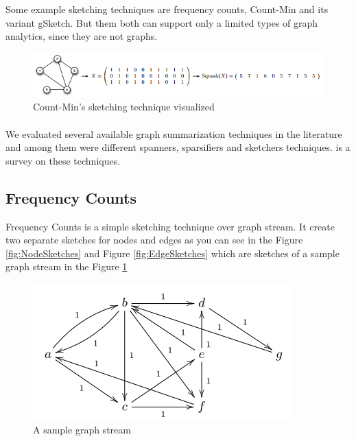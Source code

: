 \documentclass[12pt]{report}
\numberwithin{figure}{section}
\numberwithin{table}{section}
\begin{document}
Some example sketching techniques are frequency counts\cite{frequency counts}, Count-Min\cite{CountMin} and its variant gSketch\cite{gSketch}. But them both can support only a limited types of graph analytics, since they are not graphs.

\begin{figure}[H]
\centering
\includegraphics[scale=0.6]{images/image15}
\caption{Count-Min's sketching technique visualized}
\end{figure}


\paragraph{}

We evaluated several available graph summarization techniques in the literature and among them were different spanners\cite{sparse spanners}, sparsifiers\cite{Spectral sparsification}  and sketchers techniques. \cite{Graph stream algorithms survey} is a survey on these techniques.    

\subsection{Frequency Counts}
Frequency Counts\cite{frequency counts} is a simple sketching technique over graph stream. It create two separate sketches for nodes and edges as you can see in the Figure \ref{fig:NodeSketches} and Figure \ref{fig:EdgeSketches} which are sketches of a sample graph stream in the Figure \ref{fig:SampleGraphStream}

\begin{figure}[H]
\centering
\includegraphics[scale=0.6]{images/SampleGraphStream}
\caption{A sample graph stream}
\label{fig:SampleGraphStream}
\end{figure}
\end{document}
